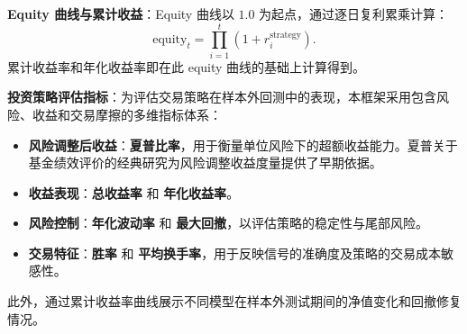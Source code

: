 \textbf{Equity 曲线与累计收益}：Equity 曲线以 $1.0$ 为起点，通过逐日复利累乘计算：
\[
\text{equity}_t = \prod_{i=1}^{t}\left(1 + r_i^{\text{strategy}}\right).
\]
累计收益率和年化收益率即在此 equity 曲线的基础上计算得到。

\textbf{投资策略评估指标}：为评估交易策略在样本外回测中的表现，本框架采用包含风险、收益和交易摩擦的多维指标体系：
\begin{itemize}
    \item \textbf{风险调整后收益}：\textbf{夏普比率}，用于衡量单位风险下的超额收益能力。夏普关于基金绩效评价的经典研究为风险调整收益度量提供了早期依据\cite{sharpe1966mutual}。
    \item \textbf{收益表现}：\textbf{总收益率} 和 \textbf{年化收益率}。
    \item \textbf{风险控制}：\textbf{年化波动率} 和 \textbf{最大回撤}，以评估策略的稳定性与尾部风险。
    \item \textbf{交易特征}：\textbf{胜率} 和 \textbf{平均换手率}，用于反映信号的准确度及策略的交易成本敏感性。
\end{itemize}
此外，通过累计收益率曲线展示不同模型在样本外测试期间的净值变化和回撤修复情况。













